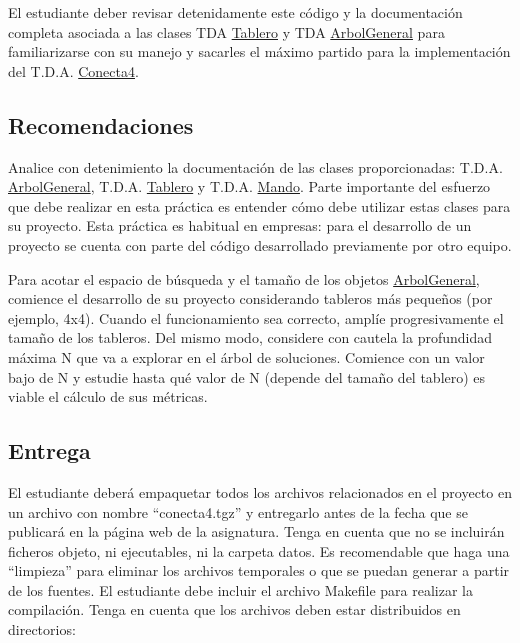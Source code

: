 El estudiante deber revisar detenidamente este código y la documentación completa asociada a las clases T\+DA \hyperlink{classTablero}{Tablero} y T\+DA \hyperlink{classArbolGeneral}{Arbol\+General} para familiarizarse con su manejo y sacarles el máximo partido para la implementación del T.\+D.\+A. \hyperlink{classConecta4}{Conecta4}.\hypertarget{index_recomendaciones}{}\subsection{Recomendaciones}\label{index_recomendaciones}

\begin{DoxyItemize}
\item Analice con detenimiento la documentación de las clases proporcionadas\+: T.\+D.\+A. \hyperlink{classArbolGeneral}{Arbol\+General}, T.\+D.\+A. \hyperlink{classTablero}{Tablero} y T.\+D.\+A. \hyperlink{classMando}{Mando}. Parte importante del esfuerzo que debe realizar en esta práctica es entender cómo debe utilizar estas clases para su proyecto. Esta práctica es habitual en empresas\+: para el desarrollo de un proyecto se cuenta con parte del código desarrollado previamente por otro equipo.
\item Para acotar el espacio de búsqueda y el tamaño de los objetos \hyperlink{classArbolGeneral}{Arbol\+General}, comience el desarrollo de su proyecto considerando tableros más pequeños (por ejemplo, 4x4). Cuando el funcionamiento sea correcto, amplíe progresivamente el tamaño de los tableros. Del mismo modo, considere con cautela la profundidad máxima N que va a explorar en el árbol de soluciones. Comience con un valor bajo de N y estudie hasta qué valor de N (depende del tamaño del tablero) es viable el cálculo de sus métricas.
\end{DoxyItemize}\hypertarget{index_entrega}{}\subsection{Entrega}\label{index_entrega}
El estudiante deberá empaquetar todos los archivos relacionados en el proyecto en un archivo con nombre “conecta4.\+tgz” y entregarlo antes de la fecha que se publicará en la página web de la asignatura. Tenga en cuenta que no se incluirán ficheros objeto, ni ejecutables, ni la carpeta datos. Es recomendable que haga una “limpieza” para eliminar los archivos temporales o que se puedan generar a partir de los fuentes. El estudiante debe incluir el archivo Makefile para realizar la compilación. Tenga en cuenta que los archivos deben estar distribuidos en directorios\+:

